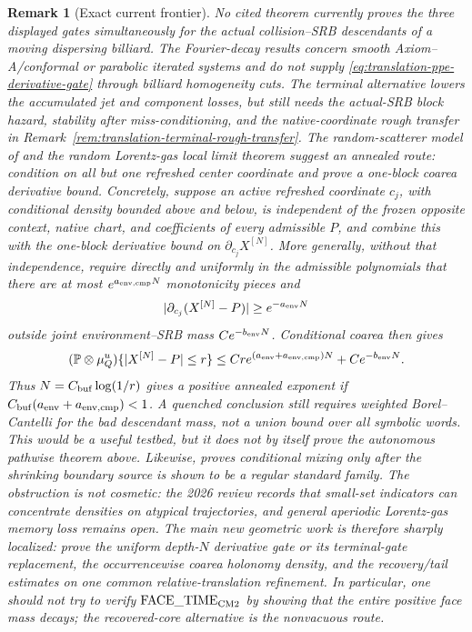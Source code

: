 \documentclass[11pt]{article}
\newtheorem{remark}[theorem]{Remark}
\begin{document}
\begin{remark}[Exact current frontier]
\label{rem:translation-research-frontier}
No cited theorem currently proves the three displayed gates simultaneously
for the actual collision--SRB descendants of a moving dispersing billiard.
The Fourier-decay results \cite{LPS,Leclerc2026} concern smooth
Axiom--A/conformal or parabolic iterated systems and do not supply
\eqref{eq:translation-ppe-derivative-gate} through billiard homogeneity
cuts.  The terminal alternative lowers the accumulated jet and component
losses, but still needs the actual-SRB block hazard, stability after
miss-conditioning, and the native-coordinate rough transfer in
Remark~\ref{rem:translation-terminal-rough-transfer}.  The random-scatterer model of \cite{StenlundRandom} and the random
Lorentz-gas local limit theorem \cite{DemersPeneZhang} suggest an annealed
route: condition on all but one refreshed center coordinate and prove a
one-block coarea derivative bound.  Concretely, suppose an active refreshed
coordinate $c_j$, with conditional density bounded above and below, is
independent of the frozen opposite context, native chart, and coefficients
of every admissible $P$, and combine this with the one-block derivative
bound on $\partial_{c_j}X^{[N]}$.  More generally, without that independence,
require directly and uniformly in the admissible polynomials that there are
at most $e^{a_{\rm env,cmp}N}$ monotonicity pieces and
\[
 |\partial_{c_j}(X^{[N]}-P)|\ge e^{-a_{\rm env}N}
\]
outside joint environment--SRB mass $Ce^{-b_{\rm env}N}$.  Conditional
coarea then gives
\[
 (\mathbb P\otimes\mu_Q^u)\{|X^{[N]}-P|\le r\}
 \le C r e^{(a_{\rm env}+a_{\rm env,cmp})N}
      +Ce^{-b_{\rm env}N}.
\]
Thus $N=C_{\rm buf}\log(1/r)$ gives a positive annealed exponent if
$C_{\rm buf}(a_{\rm env}+a_{\rm env,cmp})<1$.  A quenched conclusion still
requires weighted Borel--Cantelli for the bad descendant mass, not a union
bound over all symbolic words.  This would be a useful testbed, but it does
not by itself prove the autonomous pathwise theorem above.  Likewise,
\cite{CanestrariHoles} proves conditional mixing only after the shrinking
boundary source is shown to be a regular standard family.  The obstruction
is not cosmetic: the 2026 review \cite[Problem~8.7]{DLreview} records that
small-set indicators can concentrate densities on atypical trajectories,
and general aperiodic Lorentz-gas memory loss remains open.  The main new
geometric work is therefore sharply localized: prove the uniform
depth-$N$ derivative gate or its terminal-gate replacement, the
occurrencewise coarea holonomy density, and
the recovery/tail estimates on one common relative-translation refinement.
In particular, one should not try to verify
$\mathrm{FACE\_TIME}_{\rm CM2}$ by showing that the entire positive face
mass decays; the recovered-core alternative is the nonvacuous route.
\end{remark}
\end{document}
